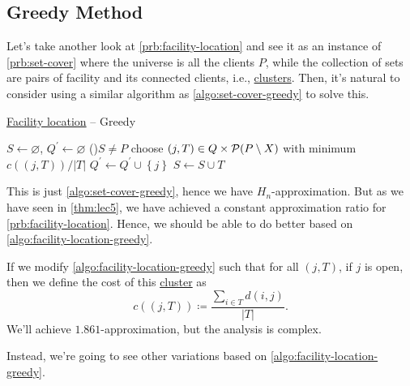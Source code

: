 \subsection{Greedy Method}
Let's take another look at \autoref{prb:facility-location} and see it as an instance of \autoref{prb:set-cover} where the universe is all the clients \(P\), while the collection of sets are pairs of facility and its connected clients, i.e., \hyperref[def:cluster]{clusters}. Then, it's natural to consider using a similar algorithm as \autoref{algo:set-cover-greedy} to solve this.

\begin{algorithm}[H]\label{algo:facility-location-greedy}
	\DontPrintSemicolon
	\caption{\hyperref[prb:facility-location]{Facility location} -- Greedy}
	\BlankLine

	\(S \gets \varnothing \), \(Q^\prime \gets \varnothing\)\;
	\While(){\(S \neq P \)}{
		choose \((j, T)\in Q \times \mathcal{\MakeUppercase{p}} (P\setminus X)\) with minimum \(c((j, T)) / \left\vert T \right\vert \)\;
		\(Q^\prime \gets Q^\prime  \cup \left\{ j \right\}\)\;
		\(S \gets S \cup T\)\;
	}
	\;
\end{algorithm}

This is just \autoref{algo:set-cover-greedy}, hence we have \(H_n\)-approximation. But as we have seen in \autoref{thm:lec5}, we have achieved a constant approximation ratio for \autoref{prb:facility-location}. Hence, we should be able to do better based on \autoref{algo:facility-location-greedy}.

\begin{remark}
	If we modify \autoref{algo:facility-location-greedy} such that for all \((j, T)\), if \(j\) is open, then we define the cost of this \hyperref[def:cluster]{cluster} as
	\[
		c((j, T))\coloneqq \frac{\sum_{i\in T} d(i, j)}{\left\vert T \right\vert }.
	\]
	We'll achieve \(1.861\)-approximation, but the analysis is complex.
\end{remark}

Instead, we're going to see other variations based on \autoref{algo:facility-location-greedy}.

